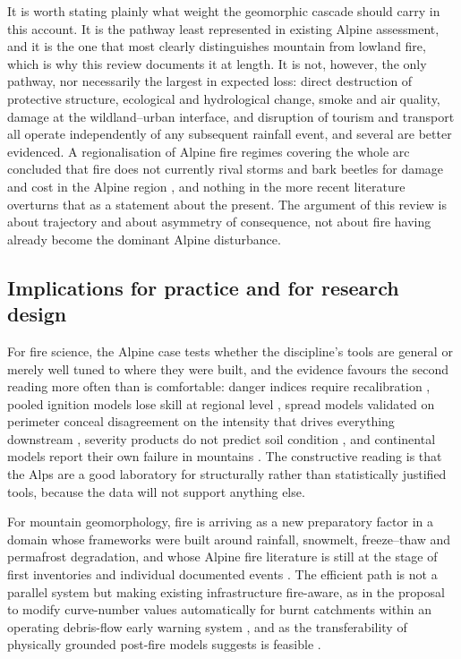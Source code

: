 \documentclass[11pt,a4paper]{article}
\begin{document}
It is worth stating plainly what weight the geomorphic cascade should carry in this account. It is the pathway least represented in existing Alpine assessment, and it is the one that most clearly distinguishes mountain from lowland fire, which is why this review documents it at length. It is not, however, the only pathway, nor necessarily the largest in expected loss: direct destruction of protective structure, ecological and hydrological change, smoke and air quality, damage at the wildland--urban interface, and disruption of tourism and transport all operate independently of any subsequent rainfall event, and several are better evidenced. A regionalisation of Alpine fire regimes covering the whole arc concluded that fire does not currently rival storms and bark beetles for damage and cost in the Alpine region \citep{conedera_characterizing_2018}, and nothing in the more recent literature overturns that as a statement about the present. The argument of this review is about trajectory and about asymmetry of consequence, not about fire having already become the dominant Alpine disturbance.

\subsection{Implications for practice and for research design}

For fire science, the Alpine case tests whether the discipline's tools are general or merely well tuned to where they were built, and the evidence favours the second reading more often than is comfortable: danger indices require recalibration \citep{de_angelis_modelling_2015, zacharakis_environmental_2023}, pooled ignition models lose skill at regional level \citep{gelabert_assessing_2025}, spread models validated on perimeter conceal disagreement on the intensity that drives everything downstream \citep{malanchini_modeling_2025}, severity products do not predict soil condition \citep{negri_wildfire_2026}, and continental models report their own failure in mountains \citep{forrest_understanding_2024}. The constructive reading is that the Alps are a good laboratory for structurally rather than statistically justified tools, because the data will not support anything else.

For mountain geomorphology, fire is arriving as a new preparatory factor in a domain whose frameworks were built around rainfall, snowmelt, freeze--thaw and permafrost degradation, and whose Alpine fire literature is still at the stage of first inventories \citep{melzner_wildfire-induced_2025} and individual documented events \citep{tiranti_wildfires_2021, laporta_postwildfire_2025, melzner_brief_2019}. The efficient path is not a parallel system but making existing infrastructure fire-aware, as in the proposal to modify curve-number values automatically for burnt catchments within an operating debris-flow early warning system \citep{tiranti_wildfires_2021}, and as the transferability of physically grounded post-fire models suggests is feasible \citep{diakakis_exploring_2023}.
\end{document}
